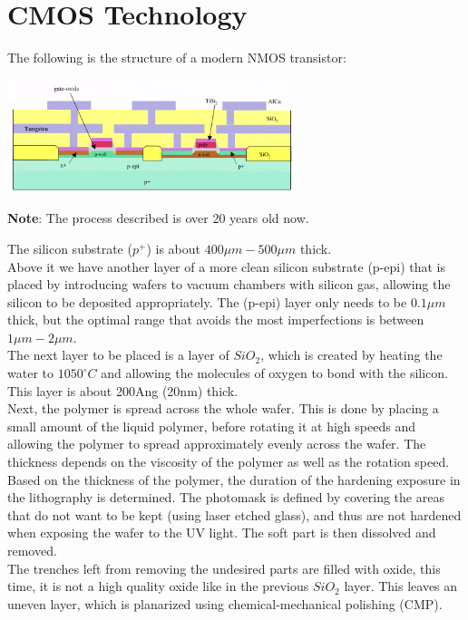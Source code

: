 \documentclass[nobib,fleqn,8pt]{article}
\begin{document}
\section{CMOS Technology}
The following is the structure of a modern NMOS transistor:
\begin{center}
    \includegraphics*[height = 125px]{images/modern_cmos_composition.png}
\end{center}
\begin{mdframed}
    \textbf{Note}: The process described is over 20 years old now.    
\end{mdframed}
The silicon substrate ($p^+$) is about $400\mu m - 500\mu m$ thick. \\
Above it we have another layer of a more clean silicon substrate (p-epi) that is placed by introducing wafers to vacuum chambers with silicon gas, allowing the silicon to be deposited appropriately. The (p-epi) layer only needs to be $0.1\mu m$ thick, but the optimal range that avoids the most imperfections is between $1\mu m-2\mu m$.\\
The next layer to be placed is a layer of $SiO_2$, which is created by heating the water to $1050^\circ C$ and allowing the molecules of oxygen to bond with the silicon. This layer is about 200Ang (20nm) thick.\\
Next, the polymer is spread across the whole wafer. This is done by placing a small amount of the liquid polymer, before rotating it at high speeds and allowing the polymer to spread approximately evenly across the wafer. The thickness depends on the viscosity of the polymer as well as the rotation speed.\\
Based on the thickness of the polymer, the duration of the hardening exposure in the lithography is determined. The photomask is defined by covering the areas that do not want to be kept (using laser etched glass), and thus are not hardened when exposing the wafer to the UV light. The soft part is then dissolved and removed.\\
The trenches left from removing the undesired parts are filled with oxide, this time, it is not a high quality oxide like in the previous $SiO_2$ layer. This leaves an uneven layer, which is planarized using chemical-mechanical polishing (CMP). \\
\end{document}
